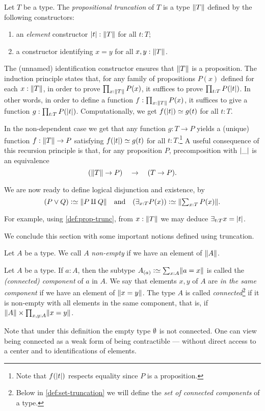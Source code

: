\begin{definition}\label{def:prop-trunc}
Let $T$ be a type. The \emph{propositional truncation} of $T$
is a type  $\lVert T\rVert$ defined by the following constructors:
\begin{enumerate}
\item an \emph{element} constructor $\lvert t\rvert : \lVert T\rVert$ for all $t:T$;
\item a constructor identifying $x=y$  for all $x,y:\lVert T\rVert$.
\end{enumerate}
The (unnamed) identification constructor ensures that $\lVert T\rVert$ is a
proposition. The induction principle states that,
for any family of propositions $P(x)$ defined for each $x:\lVert T\rVert$, 
in order to prove $\prod_{x:\lVert T\rVert} P(x)$,
it suffices to prove $\prod_{t:T} P(\lvert t\rvert)$. In other
words, in order to define a function $f:\prod_{x:\lVert T\rVert} P(x)$,
it suffices to give a function $g: \prod_{t:T} P(\lvert t\rvert)$.
Computationally, we get $f(\trunc{t})\jdeq g(t)$ for all $t:T$. 
\end{definition}

In the non-dependent case we get that
any function $g: T\to P$ yields a (unique) function $f:\lVert T\rVert\to P$ 
satisfying $f(\trunc{t})\jdeq g(t)$ for all $t:T$.\footnote{%
Note that $f(\lvert t\rvert)$ respects equality since $P$ is a proposition.}
A useful consequence of this recursion principle is that, 
for any proposition $P$, precomposition with $\lvert\_\rvert$ is an equivalence
\[
(\lVert T\rVert \to P) \quad \to \quad (T \to P).
\]

We are now ready to define logical disjunction and existence, by
\[
(P \vee Q) \defeq \Trunc{P \amalg Q} \quad\text{and}
\quad\textstyle (\exists_{x:T} P(x)) \defeq \Trunc*{\sum_{x:T}P(x)}.
\]

For example, using \cref{def:prop-trunc}, 
from $x:\lVert T\rVert$ we may deduce $\exists_{t:T} x=\lvert t\rvert$.

We conclude this section with some important notions defined using truncation.

\begin{definition}\label{def:non-empty}
Let $A$ be a type. We call $A$ \emph{non-empty} if we have an element of $\lVert A\rVert$.
\end{definition}

\begin{definition}\label{def:connected}
  Let $A$ be a type. If $a:A$, then the subtype $A_{(a)}\defeq \sum_{x:A}\Trunc{a=x}$
  is called the \emph{(connected) component} of $a$ in $A$.
  We say that elements $x,y$ of $A$ are \emph{in the same component}
  if we have an element of $\lVert x=y\rVert$.
  The type $A$ is called \emph{connected}\footnote{%
    Below in \cref{def:set-truncation} we will
    define the \emph{set of connected components} of a type.}
  if it is non-empty with
  all elements in the same component, that is, if
  $\lVert A\rVert \times \prod_{x,y:A} \lVert x=y\rVert$.
\end{definition}
Note that under this definition the empty type $\emptyset$ is not connected.
One can view being connected as a weak form
of being contractible --- without direct access to a center and to
identifications of elements.

